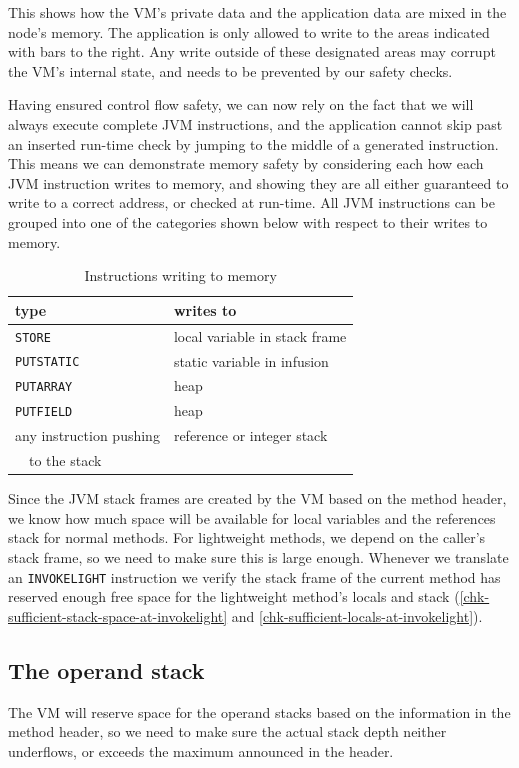 This shows how the VM's private data and the application data are mixed in the node's memory. The application is only allowed to write to the areas indicated with bars to the right. Any write outside of these designated areas may corrupt the VM's internal state, and needs to be prevented by our safety checks.

Having ensured control flow safety, we can now rely on the fact that we will always execute complete JVM instructions, and the application cannot skip past an inserted run-time check by jumping to the middle of a generated instruction. This means we can demonstrate memory safety by considering each how each JVM instruction writes to memory, and showing they are all either guaranteed to write to a correct address, or checked at run-time. All JVM instructions can be grouped into one of the categories shown below with respect to their writes to memory.

\begin{table}[H]
\centering
\caption{Instructions writing to memory}
\label{tbl-control-flow-instructions}
\begin{tabular}{ll}
\toprule
type     & writes to \\
\midrule
\texttt{STORE}                   & local variable in stack frame \\
\texttt{PUTSTATIC}               & static variable in infusion \\
\texttt{PUTARRAY}                & heap \\
\texttt{PUTFIELD}                & heap \\
any instruction pushing          & reference or integer stack \\
~~to the stack                   & \\
\bottomrule
\end{tabular}
\end{table}


Since the JVM stack frames are created by the VM based on the method header, we know how much space will be available for local variables and the references stack for normal methods. For lightweight methods, we depend on the caller's stack frame, so we need to make sure this is large enough. Whenever we translate an \texttt{INVOKELIGHT} instruction we verify the stack frame of the current method has reserved enough free space for the lightweight method's locals and stack (\ref{chk-sufficient-stack-space-at-invokelight} and \ref{chk-sufficient-locals-at-invokelight}).

\subsection{The operand stack}
The VM will reserve space for the operand stacks based on the information in the method header, so we need to make sure the actual stack depth neither underflows, or exceeds the maximum announced in the header.


